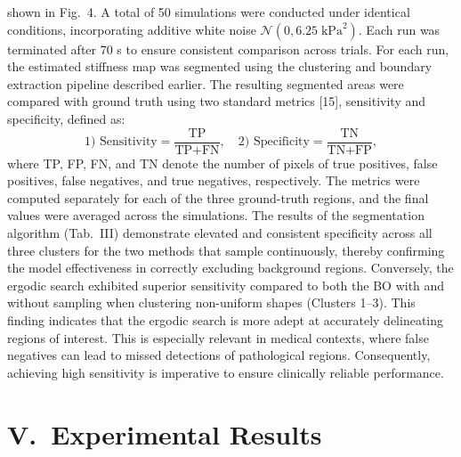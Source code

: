 \documentclass[11pt]{article}
\begin{document}
shown in Fig.~4. A total of 50 simulations were conducted under
identical conditions, incorporating additive white noise
$\mathcal{N}(0, 6.25\;\mathrm{kPa}^{2})$. Each run was terminated
after 70 s to ensure consistent comparison across trials. For each
run, the estimated stiffness map was segmented using the clustering
and boundary extraction pipeline described earlier. The resulting
segmented areas were compared with ground truth using two standard
metrics [15], sensitivity and specificity, defined as:
\[
\text{1) Sensitivity} = \frac{\text{TP}}{\text{TP}+\text{FN}},
\quad
\text{2) Specificity} = \frac{\text{TN}}{\text{TN}+\text{FP}},
\]
where TP, FP, FN, and TN denote the number of pixels of true
positives, false positives, false negatives, and true negatives,
respectively. The metrics were computed separately for each of the
three ground-truth regions, and the final values were averaged
across the simulations. The results of the segmentation algorithm
(Tab.~III) demonstrate elevated and consistent specificity across
all three clusters for the two methods that sample continuously,
thereby confirming the model effectiveness in correctly excluding
background regions. Conversely, the ergodic search exhibited
superior sensitivity compared to both the BO with and without
sampling when clustering non-uniform shapes (Clusters 1--3). This
finding indicates that the ergodic search is more adept at
accurately delineating regions of interest. This is especially
relevant in medical contexts, where false negatives can lead to
missed detections of pathological regions. Consequently, achieving
high sensitivity is imperative to ensure clinically reliable
performance.

\section*{V.\ Experimental Results}
\end{document}
